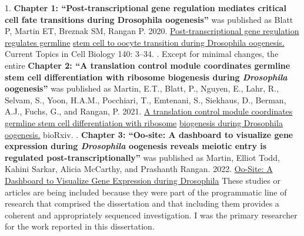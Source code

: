 \documentclass[12pt,oneside]{reedthesis}
\begin{document}
  \begin{attribution}
  \pagestyle{plain}
    1. \textbf{Chapter 1: ``Post-transcriptional gene regulation mediates critical cell fate transitions during Drosophila oogenesis''} was published as Blatt P, Martin ET, Breznak SM, Rangan P. 2020. \underline{Post-transcriptional gene regulation regulates germline} \underline{stem cell to oocyte transition during Drosophila oogenesis.} Current Topics in Cell Biology 140: 3--34.
    \newline {}. Except for minimal changes, the entire \textbf{Chapter 2: ``A translation control module coordinates germline stem cell differentiation with ribosome biogenesis during \emph{Drosophila} oogenesis''} was published as Martin, E.T., Blatt, P., Nguyen, E., Lahr, R., Selvam, S., Yoon, H.A.M., Pocchiari, T., Emtenani, S., Siekhaus, D., Berman, A.J., Fuchs, G., and Rangan, P. 2021. \underline{A translation control module coordinates germline stem cell differentiation with ribosome} \underline{biogenesis during Drosophila oogenesis.} bioRxiv.
    \newline {}. \textbf{Chapter 3: ``Oo-site: A dashboard to visualize gene expression during \emph{Drosophila} oogenesis reveals meiotic entry is regulated post-transcriptionally''} was published as Martin, Elliot Todd, Kahini Sarkar, Alicia McCarthy, and Prashanth Rangan. 2022. \underline{Oo-Site: A Dashboard to Visualize Gene Expression during Drosophila}
    \newline \newline
    These studies or articles are being included because they were part of the programmatic line of research that comprised the dissertation and that including them provides a coherent and appropriately sequenced investigation.
    \newline \newline
    I was the primary researcher for the work reported in this dissertation.
  \end{attribution}
  \hypersetup{linkcolor=black}
  \setcounter{secnumdepth}{2}
  \setcounter{tocdepth}{2}
  \pagestyle{plain}
  \tableofcontents


  \listoffigures
  \pagestyle{plain}

\mainmatter %
\pagestyle{plain} %

\end{document}
